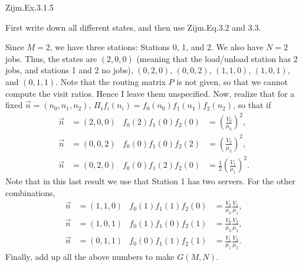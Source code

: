 \begin{exercise}
Zijm.Ex.3.1.5
\begin{hint}
 First write down all different states, and then use Zijm.Eq.3.2 and 3.3.
\end{hint}
\begin{solution}
 Since $M=2$, we have three stations: Stations 0, 1, and 2. We also
 have $N=2$ jobs. Thus, the states are $(2,0,0)$ (meaning that the
 load/unload station has 2 jobs, and stations 1 and 2 no jobs),
 $(0,2,0)$, $(0,0,2)$, $(1,1,0)$, $(1,0,1)$, and $(0,1,1)$. Note that
 the routing matrix $P$ is not given, so that we cannot compute the
 visit ratios. Hence I leave them unspecified. Now, realize that for
 a fixed $\vec n=(n_0, n_1, n_2)$,
 $\Pi_i f_i(n_i) = f_0(n_0)f_1(n_1)f_2(n_2)$, so that if 
 \begin{align*}
 \vec n &= (2,0,0) & f_0(2)f_1(0)f_2(0) &= \left(\frac{V_0}{\mu_0}\right)^2, \\
 \vec n &= (0,0,2) & f_0(0)f_1(0)f_2(2) &= \left(\frac{V_2}{\mu_2}\right)^2, \\
 \vec n &= (0,2,0) & f_0(0)f_1(2)f_2(0) &= \frac12\left(\frac{V_1}{\mu_1}\right)^2.
 \end{align*}
 Note that in this last result we use that Station 1 has two servers. For the other combinations, 
 \begin{align*}
 \vec n &= (1,1,0) & f_0(1)f_1(1)f_2(0) &= \frac{V_0}{\mu_0}\frac{V_1}{\mu_1}, \\
 \vec n &= (1,0,1) & f_0(1)f_1(0)f_2(1) &= \frac{V_0}{\mu_0}\frac{V_2}{\mu_2}, \\
 \vec n &= (0,1,1) & f_0(0)f_1(1)f_2(1) &= \frac{V_1}{\mu_1}\frac{V_2}{\mu_2}.
 \end{align*}
Finally, add up all the above numbers to make $G(M,N)$. 
\end{solution}
\end{exercise}





